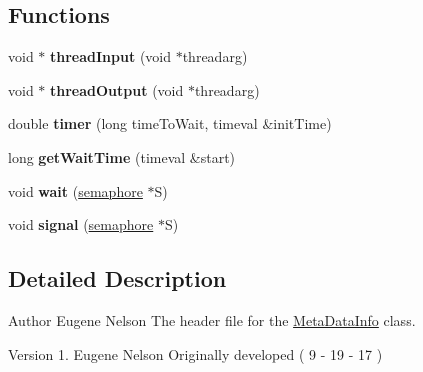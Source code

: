 \subsection*{Functions}
\begin{DoxyCompactItemize}
\item 
void $\ast$ {\bfseries thread\+Input} (void $\ast$threadarg)\hypertarget{_meta_data_info_8hh_a34d478987de22d6dae77627986271dd5}{}\label{_meta_data_info_8hh_a34d478987de22d6dae77627986271dd5}

\item 
void $\ast$ {\bfseries thread\+Output} (void $\ast$threadarg)\hypertarget{_meta_data_info_8hh_afaf2db8d6ba7020c9046f5f18dd083e7}{}\label{_meta_data_info_8hh_afaf2db8d6ba7020c9046f5f18dd083e7}

\item 
double {\bfseries timer} (long time\+To\+Wait, timeval \&init\+Time)\hypertarget{_meta_data_info_8hh_a10c83acf009e6978dfe73c8f17f005c0}{}\label{_meta_data_info_8hh_a10c83acf009e6978dfe73c8f17f005c0}

\item 
long {\bfseries get\+Wait\+Time} (timeval \&start)\hypertarget{_meta_data_info_8hh_ac1ab7dd5d0fb56f18ad19f75bd71fcef}{}\label{_meta_data_info_8hh_ac1ab7dd5d0fb56f18ad19f75bd71fcef}

\item 
void {\bfseries wait} (\hyperlink{structsemaphore}{semaphore} $\ast$S)\hypertarget{_meta_data_info_8hh_a87d54bae482251df209ea19e2bab91a0}{}\label{_meta_data_info_8hh_a87d54bae482251df209ea19e2bab91a0}

\item 
void {\bfseries signal} (\hyperlink{structsemaphore}{semaphore} $\ast$S)\hypertarget{_meta_data_info_8hh_a75bf0e8d53a792bf2f3120e174999415}{}\label{_meta_data_info_8hh_a75bf0e8d53a792bf2f3120e174999415}

\end{DoxyCompactItemize}


\subsection{Detailed Description}
\begin{DoxyAuthor}{Author}
Eugene Nelson  The header file for the \hyperlink{class_meta_data_info}{Meta\+Data\+Info} class. 
\end{DoxyAuthor}
\begin{DoxyVersion}{Version}
1. Eugene Nelson Originally developed ( 9 -\/ 19 -\/ 17 ) 
\end{DoxyVersion}
